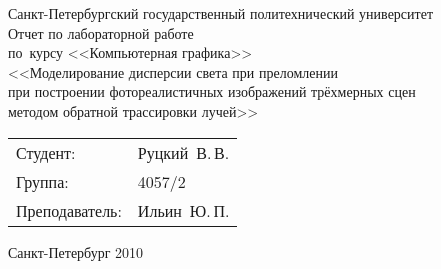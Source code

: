 
\begin{titlepage} %

\begin{center} %

\large Санкт-Петербургский государственный политехнический университет\\[4.5cm]

\huge Отчет по лабораторной работе \\[0.6cm] %
\large по~курсу <<Компьютерная графика>>\\[1cm]
\large <<Моделирование дисперсии света при преломлении \\
при построении фотореалистичных изображений трёхмерных сцен \\
методом обратной трассировки лучей>>\\[3.7cm]

\begin{flushright} %
\begin{tabular}{l l}
Студент: & Руцкий~В.\,В.\\
Группа: & 4057/2\\
Преподаватель: & Ильин~Ю.\,П.
\end{tabular}
\end{flushright} %

\vfill %

{\large Санкт-Петербург 2010}
\end{center} %
\thispagestyle{empty} %
\end{titlepage} %
